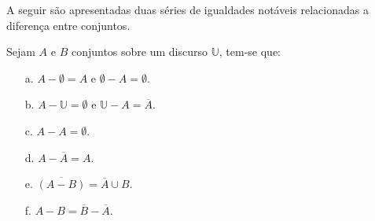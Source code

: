 A seguir são apresentadas duas séries de igualdades notáveis relacionadas a diferença entre conjuntos.

\begin{teorema}\label{teo:ElementarDiferencaConjuntos1}
	Sejam $A$ e $B$ conjuntos sobre um discurso $\mathbb{U}$, tem-se que:
	\begin{itemize}
		\item[a.] $A - \emptyset = A$ e $\emptyset - A = \emptyset$.
		\item[b.] $A - \mathbb{U} = \emptyset$ e $\mathbb{U} - A = \overline{A}$.
		\item[c.] $A - A = \emptyset$.
		\item[d.] $A - \overline{A} = A$.
		\item[e.] $\overline{(A - B)} = \overline{A} \cup B$.
		\item[f.] $A - B = \overline{B} - \overline{A}$.
	\end{itemize}
\end{teorema}

